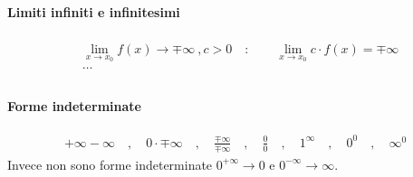 \documentclass[letterpaper,10pt,italian]{jupyterBook}
\begin{document}
\paragraph{Limiti infiniti e infinitesimi}
\label{\detokenize{ch/infinitesimal_calculus/analysis:limiti-infiniti-e-infinitesimi}}\label{\detokenize{ch/infinitesimal_calculus/analysis:infinitesimal-calculus-limits-thms-infinite-simal}}\begin{equation*}
\begin{split}\begin{aligned}
 &  \lim_{x \rightarrow x_0}f(x) \rightarrow \mp \infty \ , c > 0 \quad : \qquad \lim_{x \rightarrow x_0} c \cdot f(x) = \mp \infty \\
 & \dots \\
\end{aligned}\end{split}
\end{equation*}

\paragraph{Forme indeterminate}
\label{\detokenize{ch/infinitesimal_calculus/analysis:forme-indeterminate}}\label{\detokenize{ch/infinitesimal_calculus/analysis:infinitesimal-calculus-limits-thms-infinite-simal-undetermined}}\begin{equation*}
\begin{split}+\infty-\infty \quad , \quad 0 \cdot \mp \infty \quad , \quad \frac{\mp \infty}{\mp \infty} \quad , \quad \frac{0}{0} \quad , \quad 1^{\infty} \quad , \quad 0^0 \quad , \quad \infty^0\end{split}
\end{equation*}
\sphinxAtStartPar
{} Invece non sono forme indeterminate \(0^{+\infty} \rightarrow 0\) e \(0^{-\infty} \rightarrow \infty\).
\end{document}
